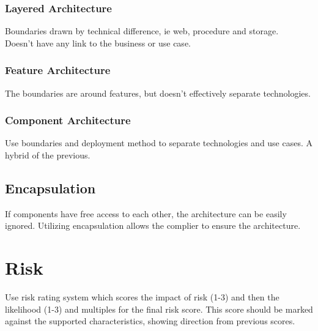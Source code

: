 \documentclass[11pt]{scrartcl} %
\begin{document}
\subsubsection{Layered Architecture}

Boundaries drawn by technical difference, ie web, procedure and storage.\\

Doesn't have any link to the business or use case.

\subsubsection{Feature Architecture}

The boundaries are around features, but doesn't effectively separate technologies.

\subsubsection{Component Architecture}

Use boundaries and deployment method to separate technologies and use cases. A hybrid of the previous.

\subsection{Encapsulation}

If components have free access to each other, the architecture can be easily ignored. Utilizing
encapsulation allows the complier to ensure the architecture.

\section{Risk}

Use risk rating system which scores the impact of risk (1-3) and then the likelihood (1-3) and multiples for the
final risk score. This score should be marked against the supported characteristics, showing direction from
previous scores.

\pagebreak

\printbibliography[
heading=bibintoc,
title={Bibliography}
] %

\end{document}
